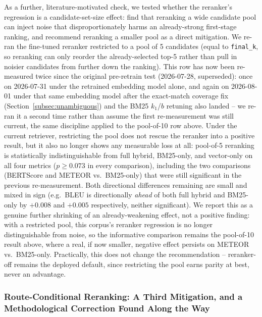 \documentclass[a4paper,twoside]{article}
\begin{document}
As a further, literature-motivated check, we tested whether the reranker's regression is a candidate-set-size effect: \citet{magomere2025} find that reranking a wide candidate pool can inject noise that disproportionately harms an already-strong first-stage ranking, and recommend reranking a smaller pool as a direct mitigation. We re-ran the fine-tuned reranker restricted to a pool of 5 candidates (equal to \texttt{final\_k}, so reranking can only reorder the already-selected top-5 rather than pull in noisier candidates from further down the ranking). This row has now been re-measured twice since the original pre-retrain test (2026-07-28, superseded): once on 2026-07-31 under the retrained embedding model alone, and again on 2026-08-01 under that same embedding model after the exact-match coverage fix (Section~\ref{subsec:unambiguous}) and the BM25 $k_1$/$b$ retuning also landed -- we re-ran it a second time rather than assume the first re-measurement was still current, the same discipline applied to the pool-of-10 row above. Under the current retriever, restricting the pool does not rescue the reranker into a positive result, but it also no longer shows any measurable loss at all: pool-of-5 reranking is statistically indistinguishable from full hybrid, BM25-only, and vector-only on all four metrics ($p\geq0.073$ in every comparison), including the two comparisons (BERTScore and METEOR vs.\ BM25-only) that were still significant in the previous re-measurement. Both directional differences remaining are small and mixed in sign (e.g.\ BLEU is directionally \emph{ahead} of both full hybrid and BM25-only by $+0.008$ and $+0.005$ respectively, neither significant). We report this as a genuine further shrinking of an already-weakening effect, not a positive finding: with a restricted pool, this corpus's reranker regression is no longer distinguishable from noise, so the informative comparison remains the pool-of-10 result above, where a real, if now smaller, negative effect persists on METEOR vs.\ BM25-only. Practically, this does not change the recommendation -- reranker-off remains the deployed default, since restricting the pool earns parity at best, never an advantage.

\subsubsection{Route-Conditional Reranking: A Third Mitigation, and a Methodological Correction Found Along the Way}
\label{subsec:reranker-route-conditional}
\end{document}
